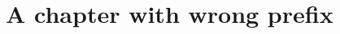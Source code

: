 \documentclass{grattan}
\begin{document}
\chapter{A chapter with wrong prefix}\label{sec:should-be-chap:}
\end{document}

